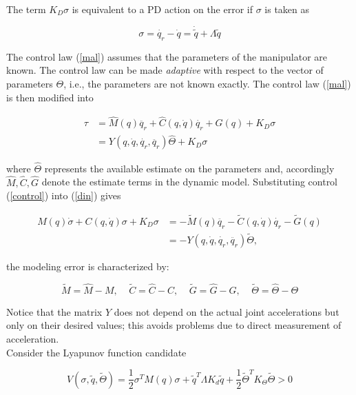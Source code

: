 The term $K_D\sigma$ is equivalent to a PD action on the error if $\sigma$ is taken as

\begin{equation}
\sigma=\dot{q_r}-\dot{q}=\dot{\tilde{q}}+\Lambda\tilde{q}
\end{equation}

The control law (\ref{mal}) assumes that the parameters of the manipulator are known. The control law can be made \textit{adaptive} with respect to the vector of parameters $\Theta$, i.e., the parameters are not known exactly. The control law (\ref{mal}) is then modified into

\begin{align}
\tau&=\hat{M}(q)\ddot{q_r}+\hat{C}(q,\dot{q})\dot{q_r}+\hat{G}(q)+K_D\sigma\nonumber\\
&=Y(q,\dot{q},\dot{q_r},\ddot{q_r})\hat{\Theta}+K_D\sigma\label{control}
\end{align}

where $\hat{\Theta}$ represents the available estimate on the parameters and, accordingly $\hat{M},\hat{C},\hat{G}$ denote the estimate terms in the dynamic model. Substituting control (\ref{control}) into (\ref{din}) gives

\begin{align}
M(q)\dot{\sigma}+C(q,\dot{q})\sigma+K_D\sigma&=-\tilde{M}(q)\ddot{q_r}-\tilde{C}(q,\dot{q})\dot{q_r}-\tilde{G}(q)\nonumber\\
&=-Y(q,\dot{q},\dot{q_r},\ddot{q_r})\tilde{\Theta},\label{tray}
\end{align}

the modeling error is characterized by:

\begin{equation}
\tilde{M}=\hat{M}-M, \ \ \ \ \ \tilde{C}=\hat{C}-C, \ \ \ \ \ \tilde{G}=\hat{G}-G, \ \ \ \ \ \tilde{\Theta}=\hat{\Theta}-\Theta
\end{equation}

Notice that the matrix $Y$ does not depend on the actual joint accelerations but only on their desired values; this avoids problems due to direct measurement of acceleration.\\

Consider the Lyapunov function candidate

\begin{equation}
V(\sigma,\tilde{q},\tilde{\Theta})=\frac{1}{2}\sigma^T M(q)\sigma+\tilde{q}^T\Lambda K_d \tilde{q}+\frac{1}{2}\tilde{\Theta}^T K_{\Theta} \tilde{\Theta}>0 \label{lyap}
\end{equation}

